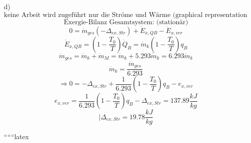 d)
\[
\text{keine Arbeit wird zugeführt nur die Ströme und Wärme (graphical representation of a system with arrows indicating mass and energy flows)}
\]
\[
\text{Exergie-Bilanz Gesamtsystem: (stationär)}
\]
\[
0 = \dot{m}_{ges} (-\Delta_{ex,Str}) + \dot{E}_{x,QB} - \dot{E}_{x,ver}
\]
\[
\dot{E}_{x,QB} = \left( 1 - \frac{T_0}{T} \right) \dot{Q}_B = \dot{m}_k \left( 1 - \frac{T_0}{T} \right) q_B
\]
\[
\dot{m}_{ges} = \dot{m}_k + \dot{m}_M = \dot{m}_k + 5.293 \dot{m}_k = 6.293 \dot{m}_k
\]
\[
\dot{m}_k = \frac{\dot{m}_{ges}}{6.293}
\]
\[
\Rightarrow 0 = -\Delta_{ex,Str} + \frac{1}{6.293} \left( 1 - \frac{T_0}{T} \right) q_B - e_{x,ver}
\]
\[
e_{x,ver} = \frac{1}{6.293} \left( 1 - \frac{T_0}{T} \right) q_B - \Delta_{ex,Str} = 137.89 \frac{kJ}{kg}
\]
\[
| \Delta_{ex,Str} = 19.78 \frac{kJ}{kg}
\]

``````latex